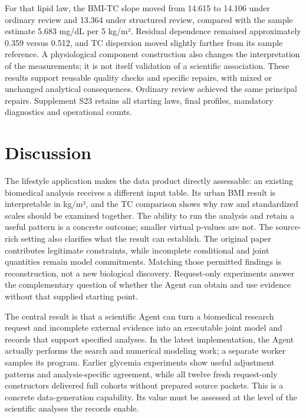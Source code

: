 \documentclass[11pt,letterpaper]{article}
\begin{document}
For that lipid law, the BMI-TC slope moved from 14.615 to 14.106 under ordinary review and 13.364 under structured review, compared with the sample estimate 5.683 mg/\allowbreak{}dL per 5 kg/\allowbreak{}m². Residual dependence remained approximately 0.359 versus 0.512, and TC dispersion moved slightly farther from its sample reference. A physiological component construction also changes the interpretation of the measurements; it is not itself validation of a scientific association. These results support reusable quality checks and specific repairs, with mixed or unchanged analytical consequences. Ordinary review achieved the same principal repairs. Supplement S23 retains all starting laws, final profiles, mandatory diagnostics and operational counts.



\section{Discussion}

The lifestyle application makes the data product directly assessable: an existing biomedical analysis receives a different input table. Its urban BMI result is interpretable in kg/\allowbreak{}m², and the TC comparison shows why raw and standardized scales should be examined together. The ability to run the analysis and retain a useful pattern is a concrete outcome; smaller virtual p-values are not. The source-rich setting also clarifies what the result can establish. The original paper contributes legitimate constraints, while incomplete conditional and joint quantities remain model commitments. Matching those permitted findings is reconstruction, not a new biological discovery. Request-only experiments answer the complementary question of whether the Agent can obtain and use evidence without that supplied starting point.


The central result is that a scientific Agent can turn a biomedical research request and incomplete external evidence into an executable joint model and records that support specified analyses. In the latest implementation, the Agent actually performs the search and numerical modeling work; a separate worker samples its program. Earlier glycemia experiments show useful adjustment patterns and analysis-specific agreement, while all twelve fresh request-only constructors delivered full cohorts without prepared source packets. This is a concrete data-generation capability. Its value must be assessed at the level of the scientific analyses the records enable.
\end{document}
